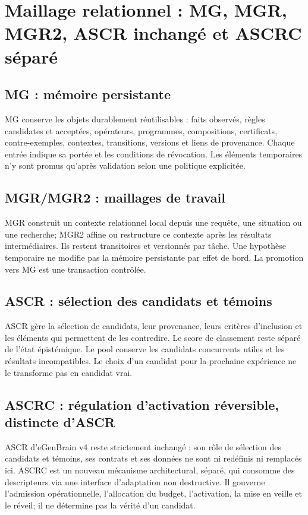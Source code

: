 \documentclass[11pt,a4paper]{article}
\begin{document}
\section{Maillage relationnel : MG, MGR, MGR2, ASCR inchangé et ASCRC séparé}
\subsection{MG : mémoire persistante}
MG conserve les objets durablement réutilisables : faits observés, règles candidates et acceptées, opérateurs, programmes, compositions, certificats, contre-exemples, contextes, transitions, versions et liens de provenance. Chaque entrée indique sa portée et les conditions de révocation. Les éléments temporaires n'y sont promus qu'après validation selon une politique explicitée.

\subsection{MGR/MGR2 : maillages de travail}
MGR construit un contexte relationnel local depuis une requête, une situation ou une recherche; MGR2 affine ou restructure ce contexte après les résultats intermédiaires. Ils restent transitoires et versionnés par tâche. Une hypothèse temporaire ne modifie pas la mémoire persistante par effet de bord. La promotion vers MG est une transaction contrôlée.

\subsection{ASCR : sélection des candidats et témoins}
ASCR gère la sélection de candidats, leur provenance, leurs critères d'inclusion et les éléments qui permettent de les contredire. Le score de classement reste séparé de l'état épistémique. Le pool conserve les candidats concurrents utiles et les résultats incompatibles. Le choix d'un candidat pour la prochaine expérience ne le transforme pas en candidat vrai.

\subsection{ASCRC : régulation d'activation réversible, distincte d'ASCR}
ASCR d'eGenBrain v4 reste strictement inchangé : son rôle de sélection des candidats et témoins, ses contrats et ses données ne sont ni redéfinis ni remplacés ici. ASCRC est un nouveau mécanisme architectural, séparé, qui consomme des descripteurs via une interface d'adaptation non destructive. Il gouverne l'admission opérationnelle, l'allocation du budget, l'activation, la mise en veille et le réveil; il ne détermine pas la vérité d'un candidat.
\end{document}
